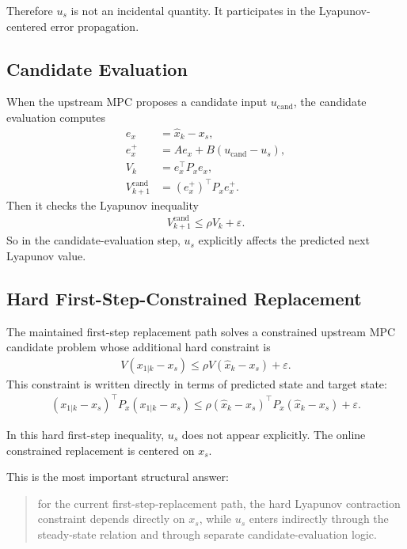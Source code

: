 \documentclass[11pt]{article}
\begin{document}
Therefore $u_s$ is not an incidental quantity. It participates in the Lyapunov-centered error propagation.

\subsection{Candidate Evaluation}

When the upstream MPC proposes a candidate input $u_{\mathrm{cand}}$, the candidate evaluation computes
\begin{align}
e_x &= \hat x_k - x_s, \\
e_x^+ &= A e_x + B(u_{\mathrm{cand}}-u_s), \\
V_k &= e_x^\top P_x e_x, \\
V_{k+1}^{\mathrm{cand}} &= (e_x^+)^\top P_x e_x^+.
\end{align}
Then it checks the Lyapunov inequality
\begin{align}
V_{k+1}^{\mathrm{cand}} \le \rho V_k + \varepsilon.
\end{align}
So in the candidate-evaluation step, $u_s$ explicitly affects the predicted next Lyapunov value.

\subsection{Hard First-Step-Constrained Replacement}

The maintained first-step replacement path solves a constrained upstream MPC candidate problem whose additional hard constraint is
\begin{align}
V(x_{1|k}-x_s) \le \rho V(\hat x_k-x_s) + \varepsilon.
\end{align}
This constraint is written directly in terms of predicted state and target state:
\begin{align}
(x_{1|k}-x_s)^\top P_x (x_{1|k}-x_s)
\le
\rho (\hat x_k-x_s)^\top P_x (\hat x_k-x_s) + \varepsilon.
\end{align}

In this hard first-step inequality, $u_s$ does not appear explicitly. The online constrained replacement is centered on $x_s$.

This is the most important structural answer:
\begin{quote}
for the current first-step-replacement path, the hard Lyapunov contraction constraint depends directly on $x_s$, while $u_s$ enters indirectly through the steady-state relation and through separate candidate-evaluation logic.
\end{quote}
\end{document}
